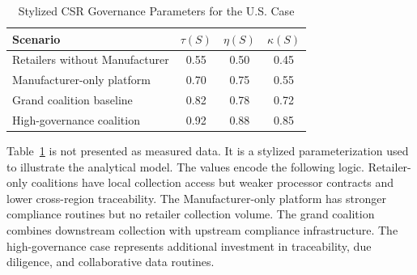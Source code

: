 \begin{table}[htbp]
\centering
\caption{Stylized CSR Governance Parameters for the U.S. Case}
\label{tab:case_governance_params}
\begin{tabular}{lccc}
\toprule
\textbf{Scenario} & $\tau(S)$ & $\eta(S)$ & $\kappa(S)$ \\
\midrule
Retailers without Manufacturer & 0.55 & 0.50 & 0.45 \\
Manufacturer-only platform & 0.70 & 0.75 & 0.55 \\
Grand coalition baseline & 0.82 & 0.78 & 0.72 \\
High-governance coalition & 0.92 & 0.88 & 0.85 \\
\bottomrule
\end{tabular}
\end{table}

Table~\ref{tab:case_governance_params} is not presented as measured data. It is a stylized parameterization used to illustrate the analytical model. The values encode the following logic. Retailer-only coalitions have local collection access but weaker processor contracts and lower cross-region traceability. The Manufacturer-only platform has stronger compliance routines but no retailer collection volume. The grand coalition combines downstream collection with upstream compliance infrastructure. The high-governance case represents additional investment in traceability, due diligence, and collaborative data routines.

\begin{table}[htbp]
\centering
\caption{Technology and Governance Logic in the Case Study}
\label{tab:case_technology_logic}
\end{table}

